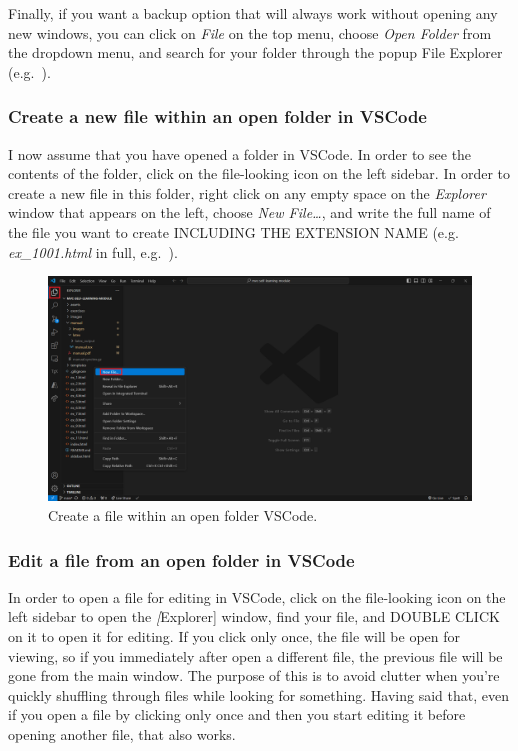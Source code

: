 \documentclass[a4paper,10pt]{article}
\begin{document}
Finally, if you want a backup option that will always work without opening any new windows, you can click on \emph{File} on the top menu, choose \emph{Open Folder} from the dropdown menu, and search for your folder through the popup File Explorer (e.g.\ ).

\subsubsection{Create a new file within an open folder in VSCode}

I now assume that you have opened a folder in VSCode. In order to see the contents of the folder, click on the file-looking icon on the left sidebar. In order to create a new file in this folder, right click on any empty space on the \emph{Explorer} window that appears on the left, choose \emph{New File\dots}, and write the full name of the file you want to create INCLUDING THE EXTENSION NAME (e.g. \emph{ex\_1001.html} in full, e.g.\ ). 

\begin{figure}[htbp]
    \centering
    \includegraphics[width=\textwidth]{vscode_create_file.png}
    \caption{Create a file within an open folder VSCode.}
    \label{fig:vscode_create_file}   
\end{figure}

\subsubsection{Edit a file from an open folder in VSCode}

In order to open a file for editing in VSCode, click on the file-looking icon on the left sidebar to open the \emph[Explorer] window, find your file, and DOUBLE CLICK on it to open it for editing. If you click only once, the file will be open for viewing, so if you immediately after open a different file, the previous file will be gone from the main window. The purpose of this is to avoid clutter when you're quickly shuffling through files while looking for something. Having said that, even if you open a file by clicking only once and then you start editing it before opening another file, that also works.
\end{document}
